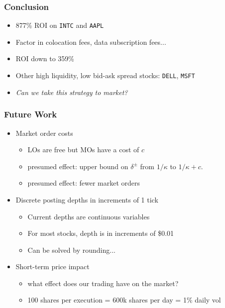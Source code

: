 \begin{frame}
\frametitle{Conclusion}
\begin{itemize}
\item 877\% ROI on \texttt{INTC} and \texttt{AAPL}
\item Factor in colocation fees, data subscription fees...
\item ROI down to 359\%
\item Other high liquidity, low bid-ask spread stocks: \texttt{DELL}, \texttt{MSFT}
\item \emph{Can we take this strategy to market?}
\end{itemize}
\end{frame}

\begin{frame}
\frametitle{Future Work}
\begin{itemize}
\item Market order costs
\begin{itemize}
\item LOs are free but MOs have a cost of $c$
\item presumed effect: upper bound on $\delta^\pm$ from $1/\kappa$ to $1/\kappa + c$.
\item presumed effect: fewer market orders
\end{itemize}
\item Discrete posting depths in increments of 1 tick
\begin{itemize}
\item Current depths are continuous variables
\item For most stocks, depth is in increments of \$0.01
\item Can be solved by rounding...
\end{itemize}
\item Short-term price impact
\begin{itemize}
\item what effect does our trading have on the market?
\item 100 shares per execution = 600k shares per day = 1\% daily vol
\end{itemize}
\end{itemize}
\end{frame}

